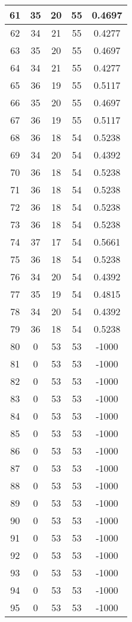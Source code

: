 \documentclass[letterpaper, 12pt]{article}
\begin{document}
\begin{longtable}{|c|c|c|c|c|}
\hline
61 & 35 & 20 & 55 & 0.4697 \\
\hline
62 & 34 & 21 & 55 & 0.4277 \\
\hline
63 & 35 & 20 & 55 & 0.4697 \\
\hline
64 & 34 & 21 & 55 & 0.4277 \\
\hline
65 & 36 & 19 & 55 & 0.5117 \\
\hline
66 & 35 & 20 & 55 & 0.4697 \\
\hline
67 & 36 & 19 & 55 & 0.5117 \\
\hline
68 & 36 & 18 & 54 & 0.5238 \\
\hline
69 & 34 & 20 & 54 & 0.4392 \\
\hline
70 & 36 & 18 & 54 & 0.5238 \\
\hline
71 & 36 & 18 & 54 & 0.5238 \\
\hline
72 & 36 & 18 & 54 & 0.5238 \\
\hline
73 & 36 & 18 & 54 & 0.5238 \\
\hline
74 & 37 & 17 & 54 & 0.5661 \\
\hline
75 & 36 & 18 & 54 & 0.5238 \\
\hline
76 & 34 & 20 & 54 & 0.4392 \\
\hline
77 & 35 & 19 & 54 & 0.4815 \\
\hline
78 & 34 & 20 & 54 & 0.4392 \\
\hline
79 & 36 & 18 & 54 & 0.5238 \\
\hline
80 & 0 & 53 & 53 & -1000 \\
\hline
81 & 0 & 53 & 53 & -1000 \\
\hline
82 & 0 & 53 & 53 & -1000 \\
\hline
83 & 0 & 53 & 53 & -1000 \\
\hline
84 & 0 & 53 & 53 & -1000 \\
\hline
85 & 0 & 53 & 53 & -1000 \\
\hline
86 & 0 & 53 & 53 & -1000 \\
\hline
87 & 0 & 53 & 53 & -1000 \\
\hline
88 & 0 & 53 & 53 & -1000 \\
\hline
89 & 0 & 53 & 53 & -1000 \\
\hline
90 & 0 & 53 & 53 & -1000 \\
\hline
91 & 0 & 53 & 53 & -1000 \\
\hline
92 & 0 & 53 & 53 & -1000 \\
\hline
93 & 0 & 53 & 53 & -1000 \\
\hline
94 & 0 & 53 & 53 & -1000 \\
\hline
95 & 0 & 53 & 53 & -1000 \\

\end{longtable}
\end{document}
